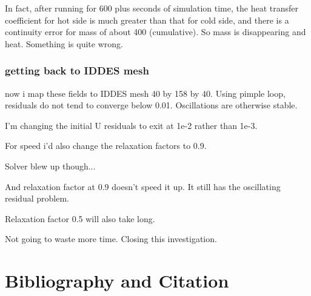 \documentclass[12pt]{article}
\renewcommand{\_}{\kern-1.5pt\textunderscore\kern-1.5pt}
\begin{document}
In fact, after running for 600 plus seconds of simulation time, the heat transfer coefficient for hot side is much greater than that for cold side, and there is a continuity error for mass of about 400 (cumulative). So mass is disappearing and heat. Something is quite wrong.


\section{getting back to IDDES mesh}

now i map these fields to IDDES mesh 40 by 158 by 40. Using pimple loop, residuals do not tend to converge below 0.01. Oscillations are otherwise stable.

I'm changing the initial U residuals to exit at 1e-2 rather than 1e-3.

For speed i'd also change the relaxation factors to 0.9. 

Solver blew up though... 

And relaxation factor at 0.9 doesn't speed it up. It still has the oscillating residual problem.

Relaxation factor 0.5 will also take long.

Not going to waste more time. Closing this investigation.


\vspace{\baselineskip}
\part{Bibliography and Citation}

\printbibliography
\end{document}
